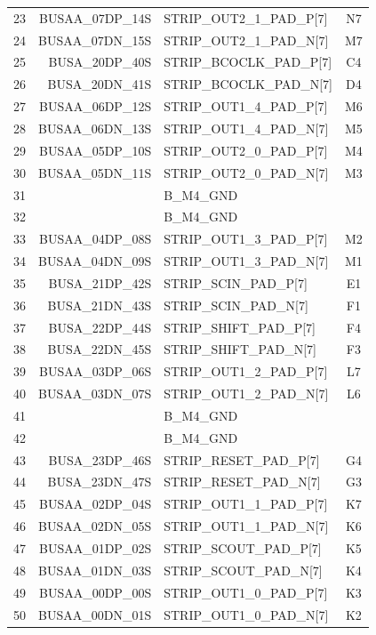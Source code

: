 \documentclass[11pt]{article}
\begin{document}
\begin{table}
\begin{center}
\begin{tabular}{|c|r|l|c|}
23 &  BUSAA\_07DP\_14S & STRIP\_OUT2\_1\_PAD\_P[7]  & N7    \\
24 &  BUSAA\_07DN\_15S & STRIP\_OUT2\_1\_PAD\_N[7]  & M7    \\ \hline
25 &   BUSA\_20DP\_40S & STRIP\_BCOCLK\_PAD\_P[7]   & C4    \\
26 &   BUSA\_20DN\_41S & STRIP\_BCOCLK\_PAD\_N[7]   & D4    \\ \hline
27 &  BUSAA\_06DP\_12S & STRIP\_OUT1\_4\_PAD\_P[7]  & M6    \\
28 &  BUSAA\_06DN\_13S & STRIP\_OUT1\_4\_PAD\_N[7]  & M5    \\ \hline
29 &  BUSAA\_05DP\_10S & STRIP\_OUT2\_0\_PAD\_P[7]  & M4    \\
30 &  BUSAA\_05DN\_11S & STRIP\_OUT2\_0\_PAD\_N[7]  & M3    \\ \hline
31 &                   & B\_M4\_GND                 &    \\
32 &                   & B\_M4\_GND                 &    \\ \hline
33 &  BUSAA\_04DP\_08S & STRIP\_OUT1\_3\_PAD\_P[7]  & M2    \\
34 &  BUSAA\_04DN\_09S & STRIP\_OUT1\_3\_PAD\_N[7]  & M1    \\ \hline
35 &   BUSA\_21DP\_42S & STRIP\_SCIN\_PAD\_P[7]     & E1    \\
36 &   BUSA\_21DN\_43S & STRIP\_SCIN\_PAD\_N[7]     & F1    \\ \hline
37 &   BUSA\_22DP\_44S & STRIP\_SHIFT\_PAD\_P[7]    & F4    \\
38 &   BUSA\_22DN\_45S & STRIP\_SHIFT\_PAD\_N[7]    & F3    \\ \hline
39 &  BUSAA\_03DP\_06S & STRIP\_OUT1\_2\_PAD\_P[7]  & L7    \\
40 &  BUSAA\_03DN\_07S & STRIP\_OUT1\_2\_PAD\_N[7]  & L6    \\ \hline
41 &                   & B\_M4\_GND                 &    \\
42 &                   & B\_M4\_GND                 &    \\ \hline
43 &   BUSA\_23DP\_46S & STRIP\_RESET\_PAD\_P[7]    & G4    \\
44 &   BUSA\_23DN\_47S & STRIP\_RESET\_PAD\_N[7]    & G3    \\ \hline
45 &  BUSAA\_02DP\_04S & STRIP\_OUT1\_1\_PAD\_P[7]  & K7    \\
46 &  BUSAA\_02DN\_05S & STRIP\_OUT1\_1\_PAD\_N[7]  & K6    \\ \hline
47 &  BUSAA\_01DP\_02S & STRIP\_SCOUT\_PAD\_P[7]    & K5    \\
48 &  BUSAA\_01DN\_03S & STRIP\_SCOUT\_PAD\_N[7]    & K4    \\ \hline
49 &  BUSAA\_00DP\_00S & STRIP\_OUT1\_0\_PAD\_P[7]  & K3    \\
50 &  BUSAA\_00DN\_01S & STRIP\_OUT1\_0\_PAD\_N[7]  & K2    \\ \hline
\end{tabular}
\end{center}
\end{table}
\end{document}
